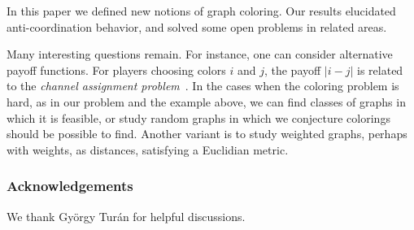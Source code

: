\documentclass{llncs}
\begin{document}
In this paper we defined new notions of graph coloring.  Our results elucidated
anti-coordination behavior, and solved some open problems in related areas.

Many interesting questions remain.  For instance, one can consider alternative
payoff functions. For players choosing colors $i$ and $j$, the payoff $|i-j|$ is
related to the \emph{channel assignment problem}~\cite{vandenHeuvel98}.  In the
cases when the coloring problem is hard, as in our problem and the example
above, we can find classes of graphs in which it is feasible, or study random
graphs in which we conjecture colorings should be possible to find.  Another
variant is to study weighted graphs, perhaps with weights, as distances,
satisfying a Euclidian metric.

\subsubsection*{Acknowledgements}
We thank Gy\"{o}rgy Tur\'{a}n for helpful discussions.



\end{document}
